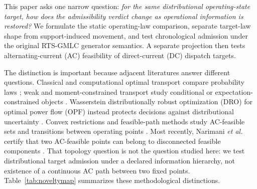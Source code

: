 \documentclass[journal]{IEEEtran}
\begin{document}
This paper asks one narrow question: \emph{for the same distributional operating-state target, how does the admissibility verdict change as operational information is restored?} We formulate the static operating-law comparison, separate target-law shape from support-induced movement, and test chronological admission under the original RTS-GMLC generator semantics. A separate projection then tests alternating-current (AC) feasibility of direct-current (DC) dispatch targets.

The distinction is important because adjacent literatures answer different questions. Classical and computational optimal transport compare probability laws \cite{Villani2009,Santambrogio2015,PeyreCuturi2019}; weak and moment-constrained transport study conditional or expectation-constrained objects \cite{Gozlan2017,Backhoff2019,Beiglbock2025,Carlier2025,Si2020,BlanchetMurthy2019,Blanchet2024,Lanzetti2025}. Wasserstein distributionally robust optimization (DRO) for optimal power flow (OPF) instead protects decisions against distributional uncertainty \cite{EsfahaniKuhn2018,RahimianMehrotra2019,GuoI2019,GuoII2019,DallAnese2018,Maghami2024,Liu2024DRUC,Lu2026}. Convex restrictions and feasible-path methods study AC-feasible sets and transitions between operating points \cite{Christianen2025,LeeRobust2021,LeePath2020}. Most recently, Narimani \emph{et al.} certify that two AC-feasible points can belong to disconnected feasible components \cite{Narimani2025}. That topology question is not the question studied here: we test distributional target admission under a declared information hierarchy, not existence of a continuous AC path between two fixed points. Table~\ref{tab:noveltymap} summarizes these methodological distinctions.
\end{document}
